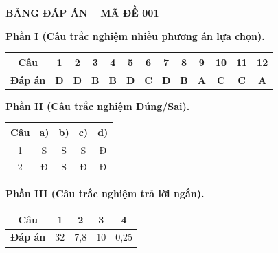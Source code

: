 \vspace{0.4cm}
\noindent\begin{minipage}{\linewidth}
\begin{center}{\large\bfseries\color{red!80!black} BẢNG ĐÁP ÁN -- MÃ ĐỀ 001}\end{center}
\vspace{0.15cm}
\noindent\textbf{Phần I (Câu trắc nghiệm nhiều phương án lựa chọn).}\par\smallskip
\begin{center}
\begin{tabular}{|c|c|c|c|c|c|c|c|c|c|c|c|c|}\hline
\textbf{Câu} & 1 & 2 & 3 & 4 & 5 & 6 & 7 & 8 & 9 & 10 & 11 & 12 \\ \hline
\textbf{Đáp án} & \textbf{D} & \textbf{D} & \textbf{B} & \textbf{B} & \textbf{D} & \textbf{C} & \textbf{D} & \textbf{B} & \textbf{A} & \textbf{C} & \textbf{C} & \textbf{A} \\ \hline
\end{tabular}
\end{center}
\noindent\textbf{Phần II (Câu trắc nghiệm Đúng/Sai).}\par\smallskip
\begin{center}
\begin{tabular}{|c|c|c|c|c|}\hline
\textbf{Câu} & \textbf{a)} & \textbf{b)} & \textbf{c)} & \textbf{d)} \\ \hline
1 & S & S & S & Đ \\ \hline
2 & Đ & S & Đ & Đ \\ \hline
\end{tabular}
\end{center}
\noindent\textbf{Phần III (Câu trắc nghiệm trả lời ngắn).}\par\smallskip
\begin{center}
\begin{tabular}{|c|c|c|c|c|}\hline
\textbf{Câu} & 1 & 2 & 3 & 4 \\ \hline
\textbf{Đáp án} & 32 & 7,8 & 10 & 0,25 \\ \hline
\end{tabular}
\end{center}
\end{minipage}
